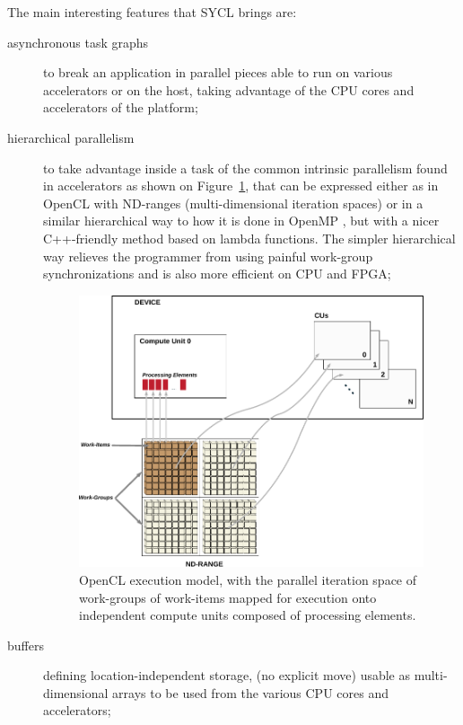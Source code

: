 \documentclass[sigplan]{acmart}
\begin{document}
The main interesting features that SYCL brings are:
\begin{description}

\item[asynchronous task graphs] to break an application in parallel
  pieces able to run on various accelerators or on the host, taking
  advantage of the CPU cores and accelerators of the platform;

\item[hierarchical parallelism] to take advantage inside a task of the
  common intrinsic parallelism found in accelerators as shown on
  Figure~\ref{fig:OpenCL-execution-model}, that can be expressed
  either as in OpenCL with ND-ranges (multi-dimensional iteration
  spaces) or in a similar hierarchical way to how it is done in OpenMP
  \cite{OpenMP-5.0-preview-1}, but with a nicer C++-friendly method
  based on lambda functions. The simpler hierarchical way relieves the
  programmer from using painful work-group synchronizations and is
  also more efficient on CPU and FPGA;

  \begin{figure}
    \includegraphics[width=\hsize]{figures/execution-model-no_GPU}
    \caption{OpenCL execution model, with the parallel iteration space
      of work-groups of work-items mapped for execution onto independent
    compute units composed of processing elements.}
    \label{fig:OpenCL-execution-model}
  \end{figure}

\item[buffers] defining location-independent storage, (no explicit
  move) usable as multi-dimensional arrays to be used from the various
  CPU cores and accelerators;


\end{description}
\end{document}
